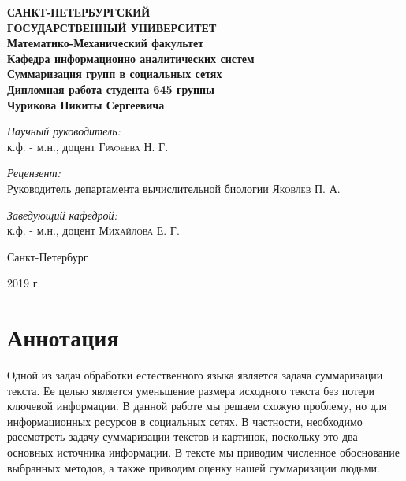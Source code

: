 \documentclass[aps,%
12pt,%
final,%
oneside,
onecolumn,%
musixtex, %
superscriptaddress,%
centertags]{article} %
\begin{document}
\begin{titlepage}
\begin{center}
\textbf{\Large САНКТ-ПЕТЕРБУРГСКИЙ \\ ГОСУДАРСТВЕННЫЙ УНИВЕРСИТЕТ} \\[1.0cm]
\textbf{\large Математико-Механический факультет} \\[0.2cm]
\textbf{\large Кафедра информационно аналитических систем}\\[3.5cm]

\textbf{\LARGE Суммаризация групп в социальных сетях}\\[1.0cm]
\textbf{\Large Дипломная работа студента 645 группы} \\[0.2cm]
\textbf{\Large Чурикова Никиты Сергеевича} \\[3.5cm]

\begin{flushright} \large
\emph{Научный руководитель:} \\
к.ф. - м.н., доцент \textsc{Графеева Н. Г.}
\end{flushright}
 \begin{flushright} \large
\emph{Рецензент:} \\
Руководитель департамента вычислительной биологии \textsc{Яковлев П. А.}
\end{flushright}
\begin{flushright} \large
\emph{Заведующий кафедрой:} \\
к.ф. - м.н., доцент \textsc{Михайлова Е. Г.}
\end{flushright}
\vfill

{\large {Санкт-Петербург}} \par
{\large {2019 г.}}
\end{center}
\end{titlepage}

\tableofcontents

\section{Аннотация}
Одной из задач обработки естественного языка является задача суммаризации текста.
Ее целью является уменьшение размера исходного текста без потери ключевой информации.
В данной работе мы решаем схожую проблему, но для информационных ресурсов в социальных сетях.
В частности, необходимо рассмотреть задачу суммаризации текстов и картинок, поскольку
это два основных источника информации. В тексте мы приводим численное обоснование
выбранных методов, а также приводим оценку нашей суммаризации людьми.
\end{document}
